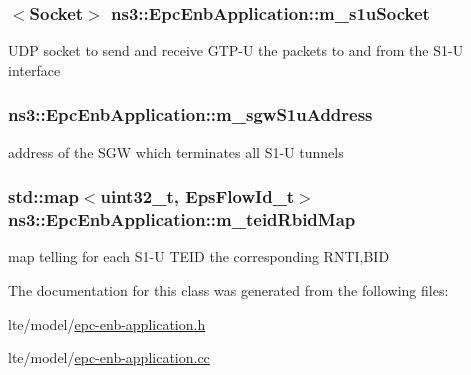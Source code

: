 \subsubsection[{\texorpdfstring{m\+\_\+s1u\+Socket}{m_s1uSocket}}]{$<${\bf Socket}$>$ ns3\+::\+Epc\+Enb\+Application\+::m\+\_\+s1u\+Socket\hspace{0.3cm}{\ttfamily [private]}}\hypertarget{classns3_1_1EpcEnbApplication_a1132d36c557a8a6134d014f6d187cb43}{}\label{classns3_1_1EpcEnbApplication_a1132d36c557a8a6134d014f6d187cb43}
U\+DP socket to send and receive G\+T\+P-\/U the packets to and from the S1-\/U interface 
\subsubsection[{\texorpdfstring{m\+\_\+sgw\+S1u\+Address}{m_sgwS1uAddress}}]{ ns3\+::\+Epc\+Enb\+Application\+::m\+\_\+sgw\+S1u\+Address\hspace{0.3cm}{\ttfamily [private]}}\hypertarget{classns3_1_1EpcEnbApplication_a45451c42063c8eefec6e0f16b36718f1}{}\label{classns3_1_1EpcEnbApplication_a45451c42063c8eefec6e0f16b36718f1}
address of the S\+GW which terminates all S1-\/U tunnels 
\subsubsection[{\texorpdfstring{m\+\_\+teid\+Rbid\+Map}{m_teidRbidMap}}]{\setlength{\rightskip}{0pt plus 5cm}std\+::map$<$uint32\+\_\+t, {\bf Eps\+Flow\+Id\+\_\+t}$>$ ns3\+::\+Epc\+Enb\+Application\+::m\+\_\+teid\+Rbid\+Map\hspace{0.3cm}{\ttfamily [private]}}\hypertarget{classns3_1_1EpcEnbApplication_abc1df9a1103bb552fc8131e9cd45ab33}{}\label{classns3_1_1EpcEnbApplication_abc1df9a1103bb552fc8131e9cd45ab33}
map telling for each S1-\/U T\+E\+ID the corresponding R\+N\+TI,B\+ID 

The documentation for this class was generated from the following files\+:\begin{DoxyCompactItemize}
\item 
lte/model/\hyperlink{epc-enb-application_8h}{epc-\/enb-\/application.\+h}\item 
lte/model/\hyperlink{epc-enb-application_8cc}{epc-\/enb-\/application.\+cc}\end{DoxyCompactItemize}
